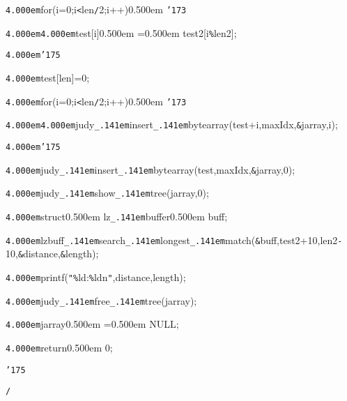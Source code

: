 \noindent
{\tt\mc \kern4.000em}for(i=0;i{\tt <}len{\tt /}2;i++)\kern0.500em {\tt\char'173}

\noindent
{\tt\mc \kern4.000em}{\tt\mc \kern4.000em}test[i]\kern0.500em =\kern0.500em test2[i{\tt\%}len2];

\noindent
{\tt\mc \kern4.000em}{\tt\char'175}

\noindent
{\tt\mc \kern4.000em}test[len]=0;

\noindent
{\tt\mc \kern4.000em}for(i=0;i{\tt <}len{\tt /}2;i++)\kern0.500em {\tt\char'173}

\noindent
{\tt\mc \kern4.000em}{\tt\mc \kern4.000em}judy{\tt\_\kern.141em}insert{\tt\_\kern.141em}bytearray(test+i,maxIdx,{\tt\&}jarray,i);

\noindent
{\tt\mc \kern4.000em}{\tt\char'175}

\noindent
{\tt\mc \kern4.000em}judy{\tt\_\kern.141em}insert{\tt\_\kern.141em}bytearray(test,maxIdx,{\tt\&}jarray,0);

\noindent
\hfill

\noindent
{\tt\mc \kern4.000em}judy{\tt\_\kern.141em}show{\tt\_\kern.141em}tree(jarray,0);

\noindent
{\tt\mc \kern4.000em}struct\kern0.500em lz{\tt\_\kern.141em}buffer\kern0.500em buff;

\noindent
{\tt\mc \kern4.000em}lzbuff{\tt\_\kern.141em}search{\tt\_\kern.141em}longest{\tt\_\kern.141em}match({\tt\&}buff,test2+10,len2{\tt -}10,{\tt\&}distance,{\tt\&}length);

\noindent
{\tt\mc \kern4.000em}printf({\tt "}{\tt\%}ld:{\tt\%}ld{\tt{}}n{\tt "},distance,length);

\noindent
{\tt\mc \kern4.000em}judy{\tt\_\kern.141em}free{\tt\_\kern.141em}tree(jarray);

\noindent
{\tt\mc \kern4.000em}jarray\kern0.500em =\kern0.500em NULL;

\noindent
{\tt\mc \kern4.000em}return\kern0.500em 0;

\noindent
{\tt\char'175}

\noindent
{\tt *}{\tt /}
\tt\mc 

\noindent
{}

\rm\mc

